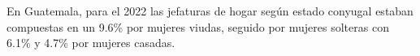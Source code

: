 En Guatemala, para el 2022 las jefaturas de hogar según estado conyugal estaban compuestas en un 9.6\% por mujeres viudas, seguido por mujeres solteras con 6.1\% y 4.7\% por mujeres casadas. 
